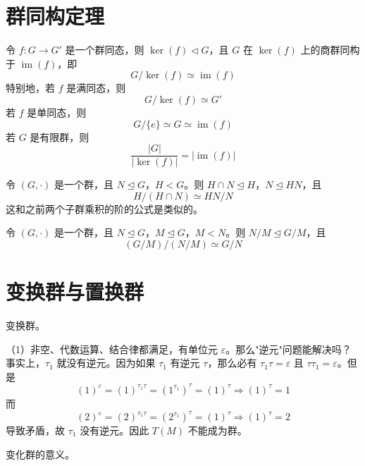 \section{群同构定理}

\begin{theorem}[群同构第一定理（定理 1.2）]
令 $f:G\to G'$ 是一个群同态，则 $\ker(f)\triangleleft G$，且 $G$ 在 $\ker(f)$ 上的商群同构于 $\operatorname{im}(f)$，即
\[
G/\ker(f)\simeq\operatorname{im}(f)
\]
特别地，若 $f$ 是满同态，则
\[
G/\ker(f)\simeq G'
\]
若 $f$ 是单同态，则
\[
G/\{e\}\simeq G\simeq\operatorname{im}(f)
\]
若 $G$ 是有限群，则
\[
\frac{|G|}{|\ker(f)|}=|\operatorname{im}(f)|
\]
\end{theorem}

\begin{theorem}[群同构第二定理（定理 1.3）]
令 $(G,\cdot)$ 是一个群，且 $N\trianglelefteq G$，$H<G$。则 $H\cap N\trianglelefteq H$，$N\trianglelefteq HN$，且
\[
H/(H\cap N)\simeq HN/N
\]
这和之前两个子群乘积的阶的公式是类似的。
\end{theorem}

\begin{theorem}[群同构第三定理（定理 1.4）]
令 $(G,\cdot)$ 是一个群，且 $N\trianglelefteq G$，$M\trianglelefteq G$，$M<N$。则 $N/M\trianglelefteq G/M$，且
\[
(G/M)/(N/M)\simeq G/N
\]
\end{theorem}

\section{变换群与置换群}

\begin{definition}[变换群]
变换群。
\end{definition}

\begin{note}[变换群证明]
（1）非空、代数运算、结合律都满足，有单位元 $\varepsilon$。那么"逆元"问题能解决吗？事实上，$\tau_1$ 就没有逆元。因为如果 $\tau_1$ 有逆元 $\tau$，那么必有 $\tau_1\tau=\varepsilon$ 且 $\tau\tau_1=\varepsilon$。但是
\[
(1)^\varepsilon=(1)^{\tau_1\tau}=(1^{\tau_1})^\tau=(1)^\tau\Rightarrow(1)^\tau=1
\]
而
\[
(2)^\varepsilon=(2)^{\tau_1\tau}=(2^{\tau_1})^\tau=(1)^\tau\Rightarrow(1)^\tau=2
\]
导致矛盾，故 $\tau_1$ 没有逆元。因此 $T(M)$ 不能成为群。
\end{note}

\begin{note}[变化群的意义]
变化群的意义。
\end{note}

